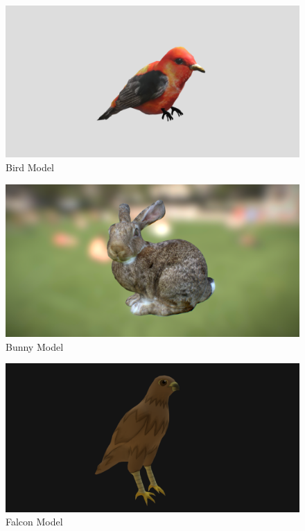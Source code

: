 \documentclass{article}
\begin{document}
    \begin{figure}
        \centering
        \includegraphics[width=\textwidth]{images/models/bird.png}
        \caption{Bird Model \cite{model-bird}} \label{fig:bird-model}
    \end{figure}
    \begin{figure}
        \centering
        \includegraphics[width=\textwidth]{images/models/bunny.png}
        \caption{Bunny Model \cite{model-bunny}} \label{fig:bunny-model}
    \end{figure}
    \begin{figure}
        \centering
        \includegraphics[width=\textwidth]{images/models/falcon.png}
        \caption{Falcon Model \cite{model-falcon}} \label{fig:falcon-model}
    \end{figure}
\end{document}
